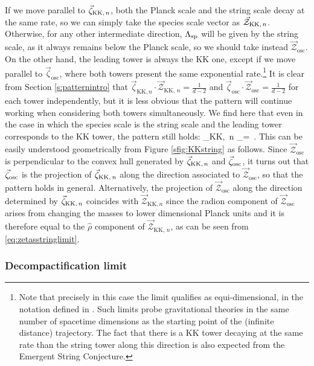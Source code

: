 If we move parallel to $\vec{\zeta}_{{\rm KK},\, n} $, both the Planck scale and the string scale decay at the same rate, so we can simply take the species scale vector as $\vec{\mathcal{Z}}_{{\rm KK},\, n}$. Otherwise, for any other intermediate direction, $\Lambda_{\text{sp}}$ will be given by the string scale, as it always remains below the Planck scale, so we should take instead $\vec{\mathcal{Z}}_{\text{osc}}$. On the other hand, the leading tower is always the KK one, except if we move parallel to $\vec{\zeta}_{\text{osc}}$, where both towers present the same exponential rate.\footnote{Note that precisely in this case the limit qualifies as equi-dimensional, in the notation defined in \cite{Lee:2019wij}. Such limits probe gravitational theories in the same number of spacetime dimensions as the starting point of the (infinite distance) trajectory. The fact that there is a KK tower decaying at the same rate than the string tower along this direction is also expected from the Emergent String Conjecture.} It is clear from Section \ref{s:patternintro} that $\vec{\zeta}_{\text{KK,}\, n} \cdot \vec{\mathcal{Z}}_{\text{KK},\, n}=\frac1{d-2}$ and $\vec{\zeta}_{\text{osc}} \cdot \vec{\mathcal{Z}}_{\text{osc}}=\frac1{d-2}$ for each tower independently, but it is less obvious that the pattern will continue working when considering both towers simultaneously. We find here that even in the case in which the species scale is the string scale and the leading tower corresponds to the KK tower, the pattern still holds:
%
\beq\label{eq:KKstring}
	\vec{\zeta}_{{\rm KK},\, n} \cdot {}_{}=\, .
\eeq
%
This can be easily understood geometrically from Figure \ref{sfig:KKstring} as follows. Since $\vec{\mathcal{Z}}_{\text{osc}}$ is perpendicular to the convex hull generated by $\vec{\zeta}_{{\rm KK},\, n}$ and $\vec{\zeta}_{\rm osc}$, it turns out that $\vec{\zeta}_{\rm osc}$ is the projection of $\vec{\zeta}_{{\rm KK},\, n}$ along the direction associated to $\vec{\mathcal{Z}}_{\text{osc}}$, so that the pattern holds in general. Alternatively, the projection of $\vec{\mathcal{Z}}_{\text{osc}}$ along the direction determined by $\vec{\zeta}_{{\rm KK},\, n}$ coincides with $\vec{\mathcal{Z}}_{\text{KK,}\, n}$ since the radion component of $\vec{\mathcal{Z}}_{\text{osc}}$ arises from changing the masses to lower dimensional Planck units and it is therefore equal to the $\hat{\rho}$ component of $\vec{\mathcal{Z}}_{\text{KK},\, n}$, as can be seen from \eqref{eq:zetasstringlimit}. 
	
\subsubsection*{Decompactification limit}
	
